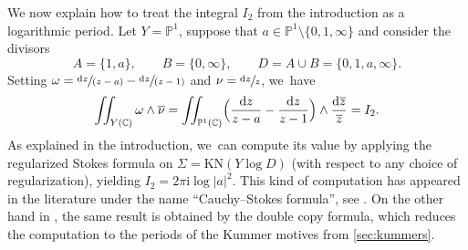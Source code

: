 \documentclass[JEP,XML,SOM,Unicode,NoFloatCountersInSection,published]{cedram}
\newcommand{\rBrac}[1]{\Bigl(#1\Bigr)}
\newcommand{\dslog}[1]{\sfrac{\dd#1}{#1}}
\newcommand{\spfrac}[2]{\sfrac{#1}{(#2)}}
\theoremstyle{definition}
\theoremstyle{remark}
\newenvironment{example}
  {\pushQED{\qed}\renewcommand{\qedsymbol}{$\lozenge$}\examplex}
  {\popQED\endexamplex}
\newcommand{\CC}{\mathbb{C}}
\newcommand{\PP}{\mathbb{P}}
\newcommand{\iu}{\mathrm{i}}
\newcommand{\ipi}{\pi\iu }
\newcommand{\tipi}{2\ipi}
\newcommand{\zb}{\overline{z}}
\newcommand{\dd}{\mathrm{d}}
\newcommand{\dlog}[1]{\frac{\dd#1}{#1}}
\newcommand{\Sig}{\Sigma}
\newcommand{\KN}[1]{\mathrm{KN}(#1)}
\begin{document}
\begin{example}We now explain how to treat the integral $I_2$ from the introduction as a logarithmic period.
Let $Y = \PP^1$, suppose that $a \in \PP^1 \setminus \{0,1,\infty\}$ and consider the divisors\vspace*{-3pt}
\[
A = \{1,a\}, \qquad B = \{0,\infty\}, \qquad D = A \cup B = \{0,1,a,\infty\}.
\]
Setting $\omega = \spfrac{\dd z}{z-a} - \spfrac{\dd z}{z-1}$ and $\nu = \dslog{z}$, we~have\vspace*{-3pt}
\[
\iint_{Y(\CC)} \omega \wedge \overline{\nu} = \iint_{\PP^1(\CC)}\rBrac{\frac{\dd z}{z-a} - \frac{\dd z}{z-1}} \wedge \dlog{\zb} = I_2.
\]
As explained in the introduction, we~can compute its value by applying the regularized Stokes formula on $\Sig = \KN{Y\log D}$ (with respect to any choice of regularization), yielding $I_2 = \tipi \log|a|^2$. This kind of computation has appeared in the literature under the name ``Cauchy--Stokes formula'', see \eg \cite{KhesinRosly}. On the other hand in \cite[Ex.\,1.6]{BrownDupont}, the same result is obtained by the double copy formula, which reduces the computation to the periods of the Kummer motives from \autoref{sec:kummers}.
\end{example}

\backmatter


\end{document}
